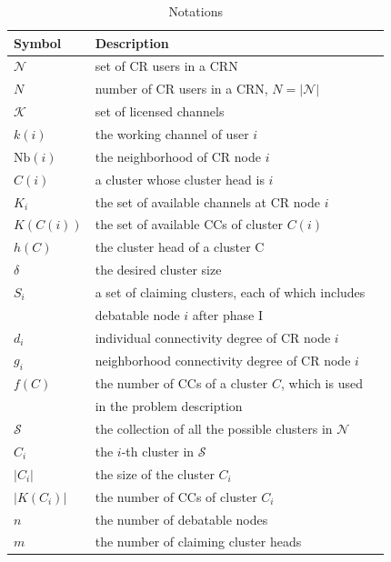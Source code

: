 \documentclass[times]{ettauth}
\theoremstyle{mytheoremstyle}
\theoremstyle{mytheoremstyle}
\theoremstyle{mytheoremstyle}
\begin{document}
\begin{table}[h!]
\caption{Notations}
\label{tab1}
\centering
\begin{tabular}{llr}
\toprule
Symbol & Description \\
\midrule
$\mathcal{N}$  & set of CR users in a CRN\\
$N$ & number of CR users in a CRN, $N=|\mathcal{N}|$\\
$\mathcal{K}$	& set of licensed channels\\
$k(i)$ & the working channel of user $i$\\
$\text{Nb}(i)$ & the neighborhood of CR node $i$    \\
$C(i)$ & a cluster whose cluster head is $i$  \\
$K_i$   & the set of available channels at CR node $i$  \\
$K(C(i))$   & the set of available CCs of cluster $C(i)$ \\
$h(C)$ & the cluster head of a cluster C\\
$\delta$ & the desired cluster size\\
$S_i$ & a set of claiming clusters, each of which includes \\
& debatable node $i$ after phase I\\
$d_i$  & individual connectivity degree of CR node $i$\\
$g_i$  & neighborhood connectivity degree of CR node $i$\\
$f(C)$ & the number of CCs of a cluster $C$, which is used \\
& in the problem description\\
 $\mathcal{S}$ & the collection of all the possible clusters in $\mathcal{N}$\\
 $C_i$  & the $i$-th cluster in $\mathcal{S}$ \\
 $|C_i|$ & the size of the cluster $C_i$\\
 $|K(C_i)|$ & the number of CCs of cluster $C_i$\\
 $n$ & the number of debatable nodes\\
 $m$ & the number of claiming cluster heads\\
\bottomrule
\end{tabular}
\end{table}
\end{document}
